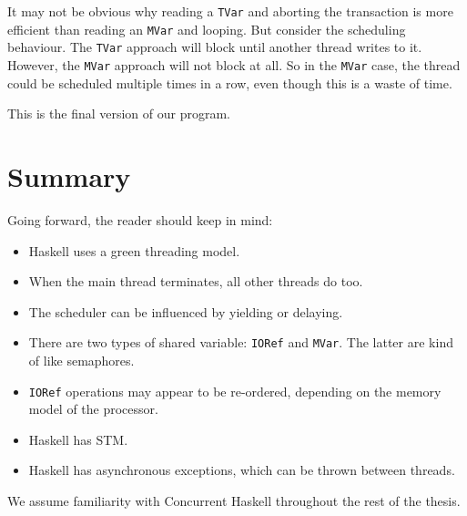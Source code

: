 It may not be obvious why reading a \verb|TVar| and aborting the
transaction is more efficient than reading an \verb|MVar| and looping.
But consider the scheduling behaviour.  The \verb|TVar| approach will
block until another thread writes to it.  However, the \verb|MVar|
approach will not block at all.  So in the \verb|MVar| case, the
thread could be scheduled multiple times in a row, even though this is
a waste of time.

This is the final version of our program.

\section{Summary}

Going forward, the reader should keep in mind:

\begin{itemize}
\item Haskell uses a green threading model.
\item When the main thread terminates, all other threads do too.
\item The scheduler can be influenced by yielding or delaying.
\item There are two types of shared variable: \verb|IORef| and
  \verb|MVar|.  The latter are kind of like semaphores.
\item \verb|IORef| operations may appear to be re-ordered, depending
  on the memory model of the processor.
\item Haskell has STM.
\item Haskell has asynchronous exceptions, which can be thrown between
  threads.
\end{itemize}

We assume familiarity with Concurrent Haskell throughout the rest of
the thesis.
